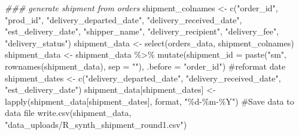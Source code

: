 \documentclass[
  letterpaper,
  DIV=11,
  numbers=noendperiod]{scrartcl}
\newenvironment{Shaded}{\begin{snugshade}}{\end{snugshade}}
\newcommand{\AttributeTok}[1]{\textcolor[rgb]{0.40,0.45,0.13}{#1}}
\newcommand{\CommentTok}[1]{\textcolor[rgb]{0.37,0.37,0.37}{#1}}
\newcommand{\DocumentationTok}[1]{\textcolor[rgb]{0.37,0.37,0.37}{\textit{#1}}}
\newcommand{\FunctionTok}[1]{\textcolor[rgb]{0.28,0.35,0.67}{#1}}
\newcommand{\NormalTok}[1]{\textcolor[rgb]{0.00,0.23,0.31}{#1}}
\newcommand{\OtherTok}[1]{\textcolor[rgb]{0.00,0.23,0.31}{#1}}
\newcommand{\SpecialCharTok}[1]{\textcolor[rgb]{0.37,0.37,0.37}{#1}}
\newcommand{\StringTok}[1]{\textcolor[rgb]{0.13,0.47,0.30}{#1}}
\begin{document}
\begin{Shaded}
\begin{Highlighting}[numbers=left,,]
\DocumentationTok{\#\#\# generate \textquotesingle{}shipment\textquotesingle{} from orders}
\NormalTok{shipment\_colnames }\OtherTok{\textless{}{-}} \FunctionTok{c}\NormalTok{(}\StringTok{"order\_id"}\NormalTok{, }\StringTok{"prod\_id"}\NormalTok{, }
                       \StringTok{"delivery\_departed\_date"}\NormalTok{,}
                       \StringTok{"delivery\_received\_date"}\NormalTok{, }\StringTok{"est\_delivery\_date"}\NormalTok{,}
                       \StringTok{"shipper\_name"}\NormalTok{, }\StringTok{"delivery\_recipient"}\NormalTok{,}
                       \StringTok{"delivery\_fee"}\NormalTok{, }\StringTok{"delivery\_status"}\NormalTok{)}
\NormalTok{shipment\_data }\OtherTok{\textless{}{-}} \FunctionTok{select}\NormalTok{(orders\_data, shipment\_colnames)}
\NormalTok{shipment\_data }\OtherTok{\textless{}{-}}\NormalTok{ shipment\_data }\SpecialCharTok{\%\textgreater{}\%} 
  \FunctionTok{mutate}\NormalTok{(}\AttributeTok{shipment\_id =} \FunctionTok{paste}\NormalTok{(}\StringTok{"sm"}\NormalTok{, }\FunctionTok{rownames}\NormalTok{(shipment\_data), }\AttributeTok{sep =} \StringTok{""}\NormalTok{), }
         \AttributeTok{.before =} \StringTok{"order\_id"}\NormalTok{)}
\CommentTok{\#reformat date}
\NormalTok{shipment\_dates }\OtherTok{\textless{}{-}} \FunctionTok{c}\NormalTok{(}\StringTok{"delivery\_departed\_date"}\NormalTok{,}
                    \StringTok{"delivery\_received\_date"}\NormalTok{, }\StringTok{"est\_delivery\_date"}\NormalTok{)}
\NormalTok{shipment\_data[shipment\_dates] }\OtherTok{\textless{}{-}} \FunctionTok{lapply}\NormalTok{(shipment\_data[shipment\_dates],}
\NormalTok{                                        format, }\StringTok{"\%d{-}\%m{-}\%Y"}\NormalTok{)}
\CommentTok{\#Save data to data file}
\FunctionTok{write.csv}\NormalTok{(shipment\_data, }\StringTok{"data\_uploads/R\_synth\_shipment\_round1.csv"}\NormalTok{)}


\end{Highlighting}
\end{Shaded}
\end{document}
